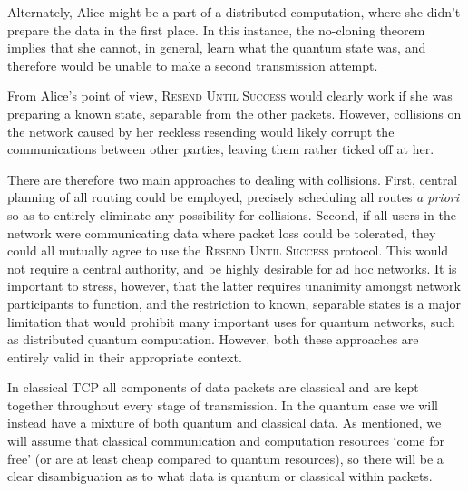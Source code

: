 \documentclass[aps, rmp, twocolumn, amsmath, amssymb, nofootinbib, superscriptaddress, longbibliography, floatfix, table-of-contents, eqsecnum]{revtex4-1}
\begin{document}
Alternately, Alice might be a part of a distributed computation, where she didn't prepare the data in the first place. In this instance, the no-cloning theorem implies that she cannot, in general, learn what the quantum state was, and therefore would be unable to make a second transmission attempt.

From Alice's point of view, \textsc{Resend Until Success} would clearly work if she was preparing a known state, separable from the other packets. However, collisions on the network caused by her reckless resending would likely corrupt the communications between other parties, leaving them rather ticked off at her.

There are therefore two main approaches to dealing with collisions. First, central planning of all routing could be employed, precisely scheduling all routes \textit{a priori} so as to entirely eliminate any possibility for collisions. Second, if all users in the network were communicating data where packet loss could be tolerated, they could all mutually agree to use the \textsc{Resend Until Success} protocol. This would not require a central authority, and be highly desirable for ad hoc networks. It is important to stress, however, that the latter requires unanimity amongst network participants to function, and the restriction to known, separable states is a major limitation that would prohibit many important uses for quantum networks, such as distributed quantum computation. However, both these approaches are entirely valid in their appropriate context.

In classical TCP all components of data packets are classical and are kept together throughout every stage of transmission. In the quantum case we will instead have a mixture of both quantum and classical data. As mentioned, we will assume that classical communication and computation resources `come for free' (or are at least cheap compared to quantum resources), so there will be a clear disambiguation as to what data is quantum or classical within packets.
\end{document}
